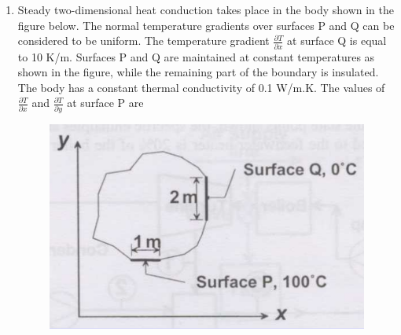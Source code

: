 \documentclass[journal,12pt,onecolumn]{IEEEtran}
\begin{document}
\begin{enumerate}
          \begin{enumerate}
          \end{enumerate}

    \item Steady two-dimensional heat conduction takes place in the body shown in the figure below. The normal temperature gradients over surfaces P and Q can be considered to be uniform. The temperature gradient $\frac{\partial{T}}{\partial{x}}$ at surface Q is equal to 10 K/m. Surfaces P and Q are maintained at constant temperatures as shown in the figure, while the remaining part of the boundary is insulated. The body has a constant thermal conductivity of 0.1 W/m.K. The values of $\frac{\partial{T}}{\partial{x}}$ and $\frac{\partial{T}}{\partial{y}}$ at surface P are

          \begin{figure}[H]
              \centering
              \includegraphics[scale=0.3]{q56}
              \caption{}
              \label{q56}
          \end{figure}

          \begin{enumerate}
          \end{enumerate}


\end{enumerate}
\end{document}
